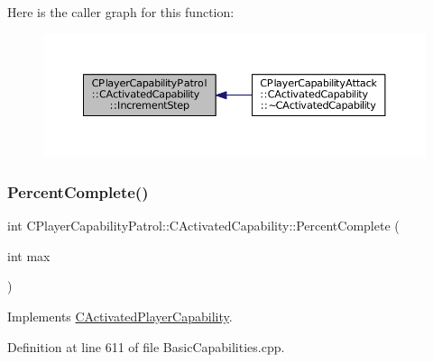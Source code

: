 Here is the caller graph for this function\+:\nopagebreak
\begin{figure}[H]
\begin{center}
\leavevmode
\includegraphics[width=350pt]{classCPlayerCapabilityPatrol_1_1CActivatedCapability_a576a71646225c0723a0ed9e77add01fd_icgraph}
\end{center}
\end{figure}
\hypertarget{classCPlayerCapabilityPatrol_1_1CActivatedCapability_a868e6583a55b01e5aa3b926ef14677bc}{}\label{classCPlayerCapabilityPatrol_1_1CActivatedCapability_a868e6583a55b01e5aa3b926ef14677bc} 
\subsubsection{\texorpdfstring{Percent\+Complete()}{PercentComplete()}}
{\footnotesize\ttfamily int C\+Player\+Capability\+Patrol\+::\+C\+Activated\+Capability\+::\+Percent\+Complete (\begin{DoxyParamCaption}\item[{int}]{max }\end{DoxyParamCaption})\hspace{0.3cm}{\ttfamily [virtual]}}



Implements \hyperlink{classCActivatedPlayerCapability_a405dc6076058006a4f801727de4cfe4d}{C\+Activated\+Player\+Capability}.



Definition at line 611 of file Basic\+Capabilities.\+cpp.



